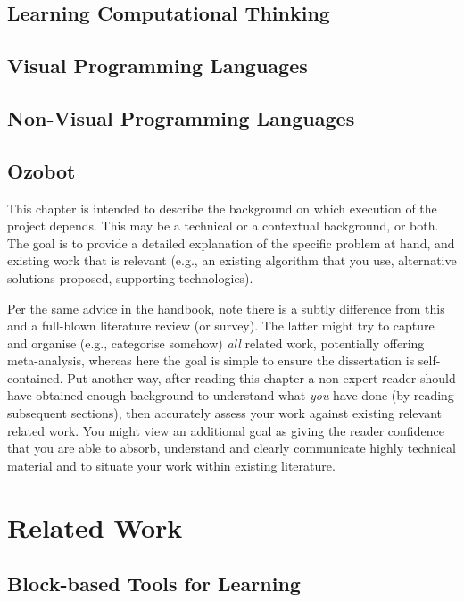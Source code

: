 \documentclass[oneside,%
                    author={Malak Hajji},
                    degree={BSc},
                    title={Designing An Accessible Computational Toolkit For Students},
                  subtitle={With Mixed Visual Abilities}]{dissertation}
\begin{document}
\section{Learning Computational Thinking}  
\section{Visual Programming Languages}
\section{Non-Visual Programming Languages}
\section{Ozobot}

\noindent
This chapter is intended to describe the background on which execution of the project depends. This may be a technical or a contextual background, or both. The goal is to provide a detailed explanation of the specific problem at hand, and existing work that is relevant (e.g., an existing algorithm that you use, alternative solutions proposed, supporting technologies).  

Per the same advice in the handbook, note there is a subtly difference from this and a full-blown literature review (or survey).  The latter might try to capture and organise (e.g., categorise somehow) \emph{all} related work, potentially offering meta-analysis, whereas here the goal is simple to ensure the dissertation is self-contained.  Put another way, after reading this chapter a non-expert reader should have obtained enough background to understand what \emph{you} have done (by reading subsequent sections), then accurately assess your work against existing relevant related work.  You might view an additional goal as giving the reader confidence that you are able to absorb, understand and clearly communicate highly technical material and to situate your work within existing literature.



\chapter{Related Work}
\label{chap:execution}

\section{Block-based Tools for Learning}
\end{document}

